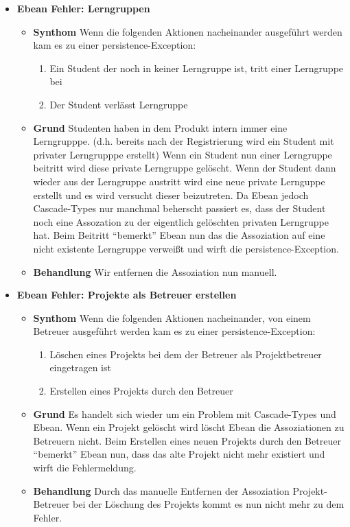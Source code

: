 \documentclass[parskip=full]{scrartcl}
\newcommand{\fehler}[4]{\textbf{#1}
 							\begin{itemize}
 							  \item \textbf{Synthom}  #2
 							  \item \textbf{Grund} #3
 							  \item \textbf{Behandlung} #4
 							\end{itemize}}
\begin{document}
\begin{itemize}
\item \fehler{Ebean Fehler: Lerngruppen}{Wenn die folgenden Aktionen
nacheinander ausgeführt werden kam es zu einer
persistence-Exception:\begin{enumerate}
  \item Ein Student der noch in keiner Lerngruppe ist, tritt einer Lerngruppe
  bei
  \item Der Student verlässt Lerngruppe
\end{enumerate}}
{Studenten haben in dem Produkt intern immer eine Lerngrupppe.
(d.h.
bereits nach der Registrierung wird ein Student mit privater Lerngrupppe
erstellt) Wenn ein Student nun einer Lerngruppe beitritt wird diese private
Lerngruppe gelöscht. Wenn der Student dann wieder aus der Lerngruppe austritt
wird eine neue private Lernguppe erstellt und es wird versucht dieser beizutreten. Da Ebean
jedoch Cascade-Types nur manchmal beherscht passiert es, dass der Student noch
eine Assozation zu der eigentlich gelöschten privaten Lerngruppe hat. Beim
Beitritt \enquote{bemerkt} Ebean nun das die Assoziation auf eine nicht
existente Lerngruppe verweißt und wirft die persistence-Exception.}{Wir
entfernen die Assoziation nun manuell.}
\item \fehler{Ebean Fehler: Projekte als Betreuer erstellen}{Wenn die folgenden
Aktionen nacheinander, von einem Betreuer ausgeführt werden kam es zu einer
persistence-Exception:
\begin{enumerate}
  \item Löschen eines Projekts bei dem der Betreuer als Projektbetreuer
  eingetragen ist
  \item Erstellen eines Projekts durch den Betreuer
\end{enumerate}}{Es handelt sich wieder um ein Problem mit Cascade-Types und
Ebean. Wenn ein Projekt gelöscht wird löscht Ebean die Assoziationen zu
Betreuern nicht. Beim Erstellen eines neuen Projekts durch den Betreuer
\enquote{bemerkt} Ebean nun, dass das alte Projekt nicht mehr existiert und
wirft die Fehlermeldung. 
}{Durch das manuelle Entfernen der Assoziation Projekt-Betreuer
bei der Löschung des Projekts kommt es nun nicht mehr zu dem Fehler. }
\end{itemize}
\end{document}
